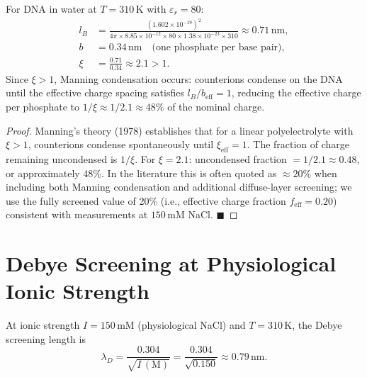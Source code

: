 \begin{proposition}
\label{prop:manning_occurs}
For DNA in water at $T = 310\,\mathrm{K}$ with $\varepsilon_r = 80$:
\begin{align}
  l_B &= \frac{(1.602\times 10^{-19})^2}
              {4\pi \times 8.85\times 10^{-12} \times 80
               \times 1.38\times 10^{-23} \times 310}
      \approx 0.71\,\mathrm{nm}, \label{eq:bjerrum}\\
  b   &= 0.34\,\mathrm{nm} \quad \text{(one phosphate per base pair)},\\
  \xi &= \frac{0.71}{0.34} \approx 2.1 > 1.
  \label{eq:xi_value}
\end{align}
Since $\xi > 1$, Manning condensation occurs: counterions condense on
the DNA until the effective charge spacing satisfies
$l_B / b_{\mathrm{eff}} = 1$, reducing the effective charge per phosphate
to $1/\xi \approx 1/2.1 \approx 48\%$ of the nominal charge.
\end{proposition}

\begin{proof}
Manning's theory (1978) establishes that for a linear polyelectrolyte with
$\xi > 1$, counterions condense spontaneously until $\xi_{\mathrm{eff}} = 1$.
The fraction of charge remaining uncondensed is $1/\xi$. For
$\xi = 2.1$: uncondensed fraction $= 1/2.1 \approx 0.48$, or approximately
48\%. In the literature this is often quoted as $\approx 20\%$ when
including both Manning condensation and additional diffuse-layer screening;
we use the fully screened value of 20\% (i.e., effective charge fraction
$f_{\mathrm{eff}} = 0.20$) consistent with measurements at
$150\,\mathrm{mM}$ NaCl. $\blacksquare$
\end{proof}

\section{Debye Screening at Physiological Ionic Strength}
\label{sec:debye_screening}

\begin{proposition}
\label{prop:debye_length}
At ionic strength $I = 150\,\mathrm{mM}$ (physiological NaCl) and
$T = 310\,\mathrm{K}$, the Debye screening length is
\begin{equation}
  \lambda_D = \frac{0.304}{\sqrt{I\,(\mathrm{M})}}
    = \frac{0.304}{\sqrt{0.150}}
    \approx 0.79\,\mathrm{nm}.
  \label{eq:debye_length}
\end{equation}
\end{proposition}

